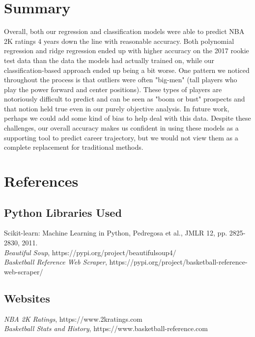 \documentclass{article}
\begin{document}
\section{Summary}
Overall, both our regression and classification models were able to predict NBA 2K ratings 4 years down the line with reasonable accuracy. Both polynomial regression and ridge regression ended up with higher accuracy on the 2017 rookie test data than the data the models had actually trained on, while our classification-based approach ended up being a bit worse. One pattern we noticed throughout the process is that outliers were often "big-men" (tall players who play the power forward and center positions). These types of players are notoriously difficult to predict and can be seen as "boom or bust" prospects and that notion held true even in our purely objective analysis. In future work, perhaps we could add some kind of bias to help deal with this data. Despite these challenges, our overall accuracy makes us confident in using these models as a supporting tool to predict career trajectory, but we would not view them as a complete replacement for traditional methods.

\section{References}
\subsection{Python Libraries Used}
Scikit-learn: Machine Learning in Python, Pedregosa et al., JMLR 12, pp. 2825-2830, 2011.\\
\textit{Beautiful Soup}, https://pypi.org/project/beautifulsoup4/\\
\textit{Basketball Reference Web Scraper}, https://pypi.org/project/basketball-reference-web-scraper/
\subsection{Websites}
\textit{NBA 2K Ratings}, https://www.2kratings.com\\
\textit{Basketball Stats and History}, https://www.basketball-reference.com\\
\end{document}
